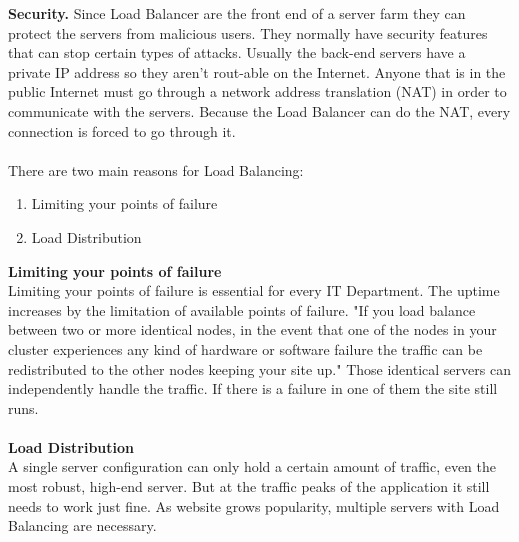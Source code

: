 \documentclass[12p]{article}
\begin{document}
	\newpage
	\textbf{Security.} Since Load Balancer are the front end of a server farm they can protect the servers from malicious users. They normally have security features that can stop certain types of attacks. Usually the back-end servers have a private IP address so they aren't rout-able on the Internet. Anyone that is in the public Internet must go through a network address translation (NAT) in order to communicate with the servers. Because the Load Balancer can do the NAT, every connection is forced to go through it.\cite{lb_SFC} \\\\
	There are two main reasons for Load Balancing:
	\begin{enumerate}
		\item Limiting your points of failure
		\item Load Distribution
		\\
	\end{enumerate}
	
	\textbf{Limiting your points of failure}\\
	Limiting your points of failure is essential for every IT Department. The uptime increases by the limitation of available points of failure. "If you load balance between two or more identical nodes, in the event that one of the nodes in your cluster experiences any kind of hardware or software failure the traffic can be redistributed to the other nodes keeping your site up." \cite{liquidweb} Those identical servers can independently handle the traffic. If there is a failure in one of them the site still runs.
	\\\\
	\textbf{Load Distribution}\\ 
	A single server configuration can only hold a certain amount of traffic, even the most robust, high-end server. But at the traffic peaks of the application it still needs to work just fine. As website grows popularity, multiple servers with Load Balancing are necessary. \cite{liquidweb}
	
	
\end{document}

